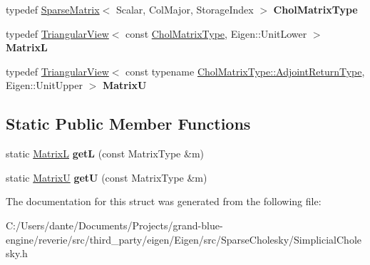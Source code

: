 \begin{DoxyCompactItemize}
typedef \mbox{\hyperlink{class_eigen_1_1_sparse_matrix}{Sparse\+Matrix}}$<$ Scalar, Col\+Major, Storage\+Index $>$ {\bfseries Chol\+Matrix\+Type}
\item 
\mbox{\label{struct_eigen_1_1internal_1_1traits_3_01_simplicial_l_d_l_t_3_01___matrix_type_00_01___up_lo_00_01___ordering_01_4_01_4_a7901e6a8ad47b88fabc8b12d01e764b4}} 
typedef \mbox{\hyperlink{class_eigen_1_1_triangular_view}{Triangular\+View}}$<$ const \mbox{\hyperlink{class_eigen_1_1_sparse_matrix}{Chol\+Matrix\+Type}}, Eigen\+::\+Unit\+Lower $>$ {\bfseries MatrixL}
\item 
\mbox{\label{struct_eigen_1_1internal_1_1traits_3_01_simplicial_l_d_l_t_3_01___matrix_type_00_01___up_lo_00_01___ordering_01_4_01_4_a0b9837dfaa2b3fba26afd6576a0fd3f7}} 
typedef \mbox{\hyperlink{class_eigen_1_1_triangular_view}{Triangular\+View}}$<$ const typename \mbox{\hyperlink{struct_eigen_1_1internal_1_1true__type}{Chol\+Matrix\+Type\+::\+Adjoint\+Return\+Type}}, Eigen\+::\+Unit\+Upper $>$ {\bfseries MatrixU}
\end{DoxyCompactItemize}
\subsection*{Static Public Member Functions}
\begin{DoxyCompactItemize}
\item 
\mbox{\label{struct_eigen_1_1internal_1_1traits_3_01_simplicial_l_d_l_t_3_01___matrix_type_00_01___up_lo_00_01___ordering_01_4_01_4_a719f994340cc13aa62370967bc335205}} 
static \mbox{\hyperlink{class_eigen_1_1_triangular_view}{MatrixL}} {\bfseries getL} (const Matrix\+Type \&m)
\item 
\mbox{\label{struct_eigen_1_1internal_1_1traits_3_01_simplicial_l_d_l_t_3_01___matrix_type_00_01___up_lo_00_01___ordering_01_4_01_4_a86a7981a576e4f288e74248b80380078}} 
static \mbox{\hyperlink{class_eigen_1_1_triangular_view}{MatrixU}} {\bfseries getU} (const Matrix\+Type \&m)
\end{DoxyCompactItemize}


The documentation for this struct was generated from the following file\+:\begin{DoxyCompactItemize}
\item 
C\+:/\+Users/dante/\+Documents/\+Projects/grand-\/blue-\/engine/reverie/src/third\+\_\+party/eigen/\+Eigen/src/\+Sparse\+Cholesky/Simplicial\+Cholesky.\+h\end{DoxyCompactItemize}
